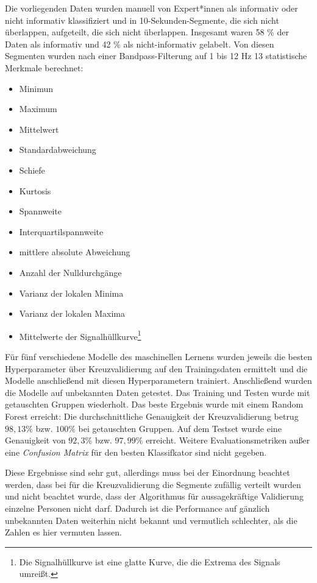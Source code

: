 	Die vorliegenden Daten wurden manuell von Expert*innen als informativ oder nicht informativ klassifiziert und in 10-Sekunden-Segmente, die sich nicht überlappen, aufgeteilt, die sich nicht überlappen. Insgesamt waren 58 \% der Daten als informativ und 42 \% als nicht-informativ gelabelt. Von diesen Segmenten wurden nach einer Bandpass-Filterung auf 1 bis 12 Hz 13 statistische Merkmale berechnet:
	\begin{multicols}{2}
	\begin{itemize}
		\item Minimun
		\item Maximum
		\item Mittelwert
		\item Standardabweichung
		\item Schiefe
		\item Kurtosis
		\item Spannweite
		\item Interquartilspannweite
		\item mittlere absolute Abweichung
		\item Anzahl der Nulldurchgänge
		\item Varianz der lokalen Minima
		\item Varianz der lokalen Maxima
		\item Mittelwerte der Signalhüllkurve\footnote{Die Signalhüllkurve ist eine glatte Kurve, die die Extrema des Signals umreißt.}
	\end{itemize}
	\end{multicols}
	
	Für fünf verschiedene Modelle des maschinellen Lernens wurden jeweils die besten Hyperparameter über Kreuzvalidierung auf den Trainingsdaten ermittelt und die Modelle anschließend mit diesen Hyperparametern trainiert. Anschließend wurden die Modelle auf unbekannten Daten getestet. Das Training und Testen wurde mit getauschten Gruppen wiederholt. Das beste Ergebnis wurde mit einem Random Forest erreicht: Die durchschnittliche Genauigkeit der Kreuzvalidierung betrug $98,13 \% $ bzw. $100 \%$ bei getauschten Gruppen. Auf dem Testset wurde eine Genauigkeit von $92,3 \%$ bzw. $97,99 \%$ erreicht. Weitere Evaluationsmetriken außer eine \textit{Confusion Matrix} für den besten Klassifkator sind nicht gegeben.
	
	Diese Ergebnisse sind sehr gut, allerdings muss bei der Einordnung beachtet werden, dass bei für die Kreuzvalidierung die Segmente zufällig verteilt wurden und nicht beachtet wurde, dass der Algorithmus für aussagekräftige Validierung einzelne Personen nicht darf. Dadurch ist die Performance auf gänzlich unbekannten Daten weiterhin nicht bekannt und vermutlich schlechter, als die Zahlen es hier vermuten lassen.
	
